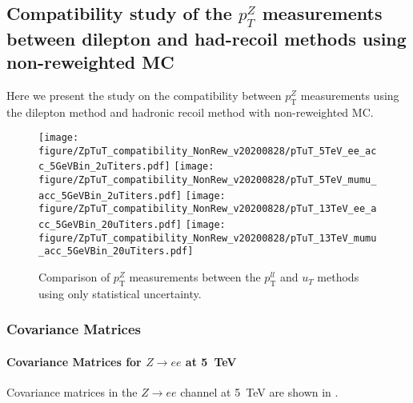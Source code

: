 \subsection{Compatibility study of the $p_{T}^{Z}$ measurements between dilepton and had-recoil methods using non-reweighted MC}
\label{App:compatibility_pTuT}

Here we present the study on the compatibility between $p_{\mathrm{T}}^{Z}$ measurements using the dilepton method and hadronic recoil method with non-reweighted MC.








\begin{figure}[h]
  \centering
  \texttt{[image: figure/ZpTuT\_compatibility\_NonRew\_v20200828/pTuT\_5TeV\_ee\_acc\_5GeVBin\_2uTiters.pdf]}
  \texttt{[image: figure/ZpTuT\_compatibility\_NonRew\_v20200828/pTuT\_5TeV\_mumu\_acc\_5GeVBin\_2uTiters.pdf]}
  \texttt{[image: figure/ZpTuT\_compatibility\_NonRew\_v20200828/pTuT\_13TeV\_ee\_acc\_5GeVBin\_20uTiters.pdf]}
  \texttt{[image: figure/ZpTuT\_compatibility\_NonRew\_v20200828/pTuT\_13TeV\_mumu\_acc\_5GeVBin\_20uTiters.pdf]}
  \caption{
 Comparison of $p_{\mathrm{T}}^{Z}$ measurements between the $p_{\mathrm{T}}^{ll}$ and $u_{T}$ methods using only statistical uncertainty. }
  \label{f:DirCompTuT}
\end{figure}


\subsubsection{Covariance Matrices}

\clearpage

\paragraph{Covariance Matrices for $Z\rightarrow ee$ at 5~TeV}
Covariance matrices in the $Z\rightarrow ee$ channel at 5~TeV are shown in \Fig{\ref{f:CovMatrix5TeVZee}}.




